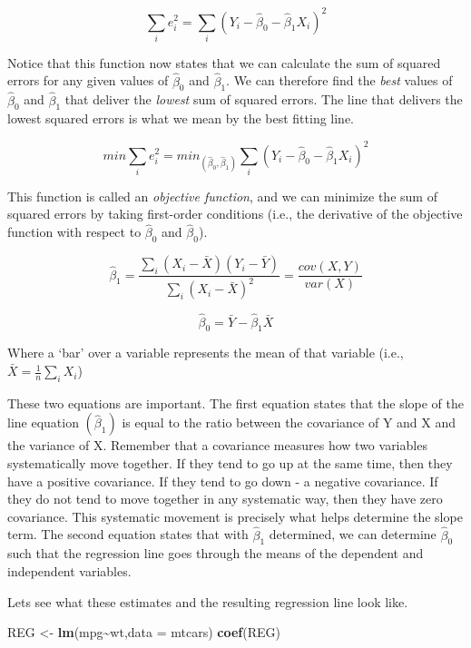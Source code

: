 \documentclass[
]{book}
\newenvironment{Shaded}{\begin{snugshade}}{\end{snugshade}}
\newcommand{\AttributeTok}[1]{\textcolor[rgb]{0.13,0.29,0.53}{#1}}
\newcommand{\FunctionTok}[1]{\textcolor[rgb]{0.13,0.29,0.53}{\textbf{#1}}}
\newcommand{\NormalTok}[1]{#1}
\newcommand{\OtherTok}[1]{\textcolor[rgb]{0.56,0.35,0.01}{#1}}
\newcommand{\SpecialCharTok}[1]{\textcolor[rgb]{0.81,0.36,0.00}{\textbf{#1}}}
\begin{document}
\[\sum_{i}e^2_i = \sum_{i}(Y_i - \hat{\beta}_0 - \hat{\beta}_1X_i)^2\]

Notice that this function now states that we can calculate the sum of squared errors for any given values of \(\hat{\beta}_0\) and \(\hat{\beta}_1\). We can therefore find the \emph{best} values of \(\hat{\beta}_0\) and \(\hat{\beta}_1\) that deliver the \emph{lowest} sum of squared errors. The line that delivers the lowest squared errors is what we mean by the best fitting line.

\[min\sum_{i}e^2_i = min_{(\hat{\beta}_0,\hat{\beta}_1)}\sum_{i}(Y_i - \hat{\beta}_0 - \hat{\beta}_1X_i)^2\]

This function is called an \emph{objective function}, and we can minimize the sum of squared errors by taking first-order conditions (i.e., the derivative of the objective function with respect to \(\hat{\beta}_0\) and \(\hat{\beta}_0\)).

\[\hat{\beta}_1=\frac{\sum_i (X_i-\bar{X})(Y_i-\bar{Y})}{\sum_i(X_i-\bar{X})^2}=\frac{cov(X,Y)}{var(X)}\]

\[\hat{\beta}_0=\bar{Y}-\hat{\beta}_1\bar{X}\]

Where a `bar' over a variable represents the mean of that variable (i.e., \(\bar{X}=\frac{1}{n}\sum_iX_i\))

These two equations are important. The first equation states that the slope of the line equation \((\hat{\beta}_1)\) is equal to the ratio between the covariance of Y and X and the variance of X. Remember that a covariance measures how two variables systematically move together. If they tend to go up at the same time, then they have a positive covariance. If they tend to go down - a negative covariance. If they do not tend to move together in any systematic way, then they have zero covariance. This systematic movement is precisely what helps determine the slope term. The second equation states that with \(\hat{\beta}_1\) determined, we can determine \(\hat{\beta}_0\) such that the regression line goes through the means of the dependent and independent variables.

Lets see what these estimates and the resulting regression line look like.

\begin{Shaded}
\begin{Highlighting}[]
\NormalTok{REG }\OtherTok{\textless{}{-}} \FunctionTok{lm}\NormalTok{(mpg}\SpecialCharTok{\textasciitilde{}}\NormalTok{wt,}\AttributeTok{data =}\NormalTok{ mtcars)}
\FunctionTok{coef}\NormalTok{(REG)}
\end{Highlighting}
\end{Shaded}
\end{document}
